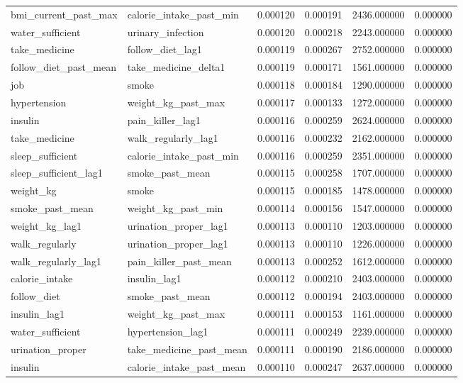 \begin{longtable}{llrrrr}
bmi\_current\_past\_max & calorie\_intake\_past\_min & 0.000120 & 0.000191 & 2436.000000 & 0.000000 \\
water\_sufficient & urinary\_infection & 0.000120 & 0.000218 & 2243.000000 & 0.000000 \\
take\_medicine & follow\_diet\_lag1 & 0.000119 & 0.000267 & 2752.000000 & 0.000000 \\
follow\_diet\_past\_mean & take\_medicine\_delta1 & 0.000119 & 0.000171 & 1561.000000 & 0.000000 \\
job & smoke & 0.000118 & 0.000184 & 1290.000000 & 0.000000 \\
hypertension & weight\_kg\_past\_max & 0.000117 & 0.000133 & 1272.000000 & 0.000000 \\
insulin & pain\_killer\_lag1 & 0.000116 & 0.000259 & 2624.000000 & 0.000000 \\
take\_medicine & walk\_regularly\_lag1 & 0.000116 & 0.000232 & 2162.000000 & 0.000000 \\
sleep\_sufficient & calorie\_intake\_past\_min & 0.000116 & 0.000259 & 2351.000000 & 0.000000 \\
sleep\_sufficient\_lag1 & smoke\_past\_mean & 0.000115 & 0.000258 & 1707.000000 & 0.000000 \\
weight\_kg & smoke & 0.000115 & 0.000185 & 1478.000000 & 0.000000 \\
smoke\_past\_mean & weight\_kg\_past\_min & 0.000114 & 0.000156 & 1547.000000 & 0.000000 \\
weight\_kg\_lag1 & urination\_proper\_lag1 & 0.000113 & 0.000110 & 1203.000000 & 0.000000 \\
walk\_regularly & urination\_proper\_lag1 & 0.000113 & 0.000110 & 1226.000000 & 0.000000 \\
walk\_regularly\_lag1 & pain\_killer\_past\_mean & 0.000113 & 0.000252 & 1612.000000 & 0.000000 \\
calorie\_intake & insulin\_lag1 & 0.000112 & 0.000210 & 2403.000000 & 0.000000 \\
follow\_diet & smoke\_past\_mean & 0.000112 & 0.000194 & 2403.000000 & 0.000000 \\
insulin\_lag1 & weight\_kg\_past\_max & 0.000111 & 0.000153 & 1161.000000 & 0.000000 \\
water\_sufficient & hypertension\_lag1 & 0.000111 & 0.000249 & 2239.000000 & 0.000000 \\
urination\_proper & take\_medicine\_past\_mean & 0.000111 & 0.000190 & 2186.000000 & 0.000000 \\
insulin & calorie\_intake\_past\_mean & 0.000110 & 0.000247 & 2637.000000 & 0.000000 \\

\end{longtable}
